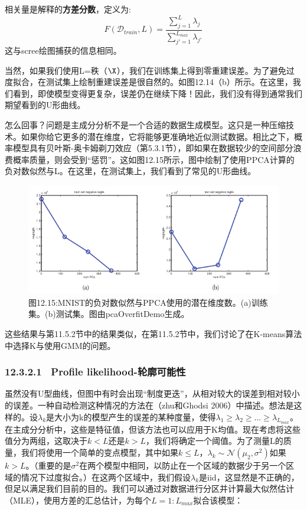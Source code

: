 \documentclass[a4paper]{article}
\begin{document}
相关量是解释的\textbf{方差分数}，定义为:
\begin{equation}
	F(\mathcal{D}_{train},L)=\dfrac{\sum\nolimits_{j=1}^L\lambda_j}{\sum\nolimits_{j'=1}^{L_{max}}\lambda_{j'}}\tag{12.69}
\end{equation}
这与scree绘图捕获的信息相同。

当然，如果我们使用L=秩（$\X$），我们在训练集上得到零重建误差。为了避免过度拟合，在测试集上绘制重建误差是很自然的。如图12.14（b）所示。在这里，我们看到，即使模型变得更复杂，误差仍在继续下降！因此，我们没有得到通常我们期望看到的U形曲线。

怎么回事？问题是主成分分析不是一个合适的数据生成模型。这只是一种压缩技术。如果你给它更多的潜在维度，它将能够更准确地近似测试数据。相比之下，概率模型具有贝叶斯-奥卡姆剃刀效应（第5.3.1节），即如果在数据较少的空间部分浪费概率质量，则会受到“惩罚”。这如图12.15所示，图中绘制了使用PPCA计算的负对数似然与L。在这里，在测试集上，我们看到了常见的U形曲线。 

\begin{figure}[h]
	\centering
	\includegraphics[width=0.7\linewidth]{fig/figure15}
	\caption*{图12.15:MNIST的负对数似然与PPCA使用的潜在维度数。(a)训练集。(b)测试集。图由pcaOverfitDemo生成。}
\end{figure}

这些结果与第11.5.2节中的结果类似，在第11.5.2节中，我们讨论了在K-means算法中选择K与使用GMM的问题。

\subsubsection*{12.3.2.1  \ Profile likelihood-轮廓可能性}
虽然没有U型曲线，但图中有时会出现“制度更迭”，从相对较大的误差到相对较小的误差。一种自动检测这种情况的方法在（zhu和Ghodsi 2006）中描述。想法是这样的。设$\lambda_k$是大小为k的模型产生的误差的某种度量，使得$\lambda_1\ge \lambda_2\ge ...\ge \lambda_{L_{max}}$。在主成分分析中，这些是特征值，但该方法也可以应用于K均值。现在考虑将这些值分为两组，这取决于$k<L$还是$k>L$，我们将确定一个阈值。为了测量L的质量，我们将使用一个简单的变点模型，其中如果$k\le L$，$\lambda_k\sim \mathcal{N}(\mu_2,\sigma^2)$如果$k>L$。（重要的是$\sigma^2$在两个模型中相同，以防止在一个区域的数据少于另一个区域的情况下过度拟合。）在这两个区域中，我们假设$\lambda_k$是iid，这显然是不正确的，但足以满足我们目前的目的。我们可以通过对数据进行分区并计算最大似然估计（MLE），使用方差的汇总估计，为每个$L=1:L_{max}$拟合该模型：
\end{document}
